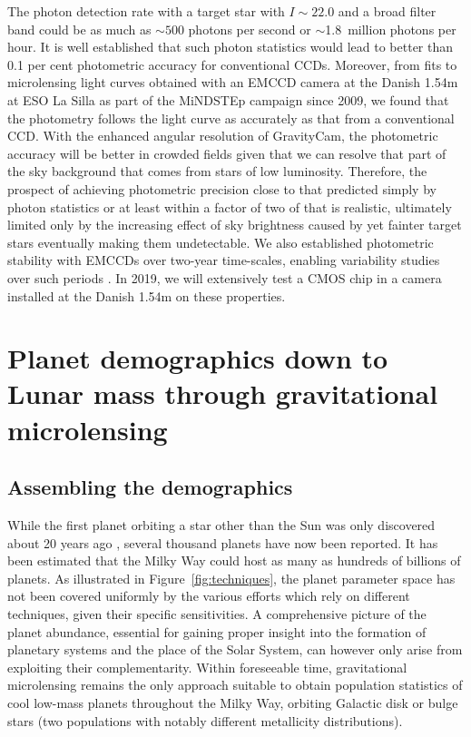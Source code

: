 \documentclass{pasa}%
\begin{document}
The photon detection rate with a target star with $I \sim 22.0$ and a broad filter band could be as much as $\sim 500$ photons per second or $\sim$1.8~million photons per hour. It is well established that such photon statistics would lead to better than 0.1 per cent photometric accuracy for conventional CCDs. Moreover, from fits to microlensing light curves obtained with an EMCCD camera at the Danish 1.54m at ESO La Silla \citep{Skottfelt+2015} as part of the MiNDSTEp campaign \citep{MiNDSTEp} since 2009, we found that the photometry follows the light curve as accurately as that from a conventional CCD. 
With the enhanced angular resolution of GravityCam, the photometric accuracy will be better in crowded fields given that we can resolve that part of the sky background that comes from stars of low luminosity.
Therefore, the prospect of achieving photometric precision close to that predicted simply by photon statistics or at least within a factor of two of that is realistic, ultimately limited only by the increasing effect of sky brightness caused by yet fainter target stars eventually making them undetectable. We also established photometric stability with EMCCDs over two-year time-scales, enabling variability studies over such periods \citep{Skottfelt+2015a}. In 2019, we will extensively test a CMOS chip in a camera installed at the Danish 1.54m on these properties.

\section{Planet demographics down to Lunar mass through gravitational microlensing}
\label{Sect:Microlensing}

\subsection{Assembling the demographics}

While the first planet orbiting a star other than the Sun was only discovered about 20 years ago \citep{MayQel1995}, several thousand planets have now been reported.  It has been estimated that the Milky Way could host as many as hundreds of billions \citep{Cassan+2012} of planets. As illustrated in Figure~\ref{fig:techniques}, the planet parameter space has not been covered uniformly by the various efforts which rely on different techniques, given their specific sensitivities. A comprehensive picture of the planet abundance, essential for gaining proper insight into the formation of planetary systems and the place of the Solar System, can however only arise from exploiting their complementarity. Within foreseeable time, gravitational microlensing \citep{Einstein1936,Pac86} remains the only approach suitable to obtain population statistics of cool low-mass planets throughout the Milky Way, orbiting Galactic disk or bulge stars (two populations with notably different metallicity distributions).
\end{document}
